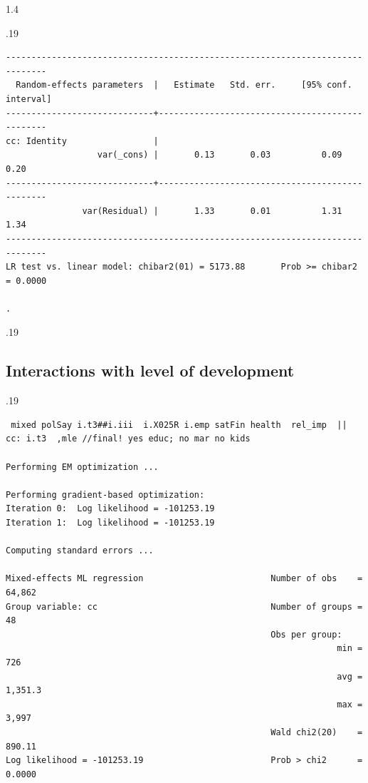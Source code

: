 \documentclass[10pt, letterpaper]{article}
\begin{document}
\begin{spacing}{1.4}
\begin{scriptsize}
\begin{spacing}{.19}
\begin{verbatim}
------------------------------------------------------------------------------
  Random-effects parameters  |   Estimate   Std. err.     [95% conf. interval]
-----------------------------+------------------------------------------------
cc: Identity                 |
                  var(_cons) |       0.13       0.03          0.09        0.20
-----------------------------+------------------------------------------------
               var(Residual) |       1.33       0.01          1.31        1.34
------------------------------------------------------------------------------
LR test vs. linear model: chibar2(01) = 5173.88       Prob >= chibar2 = 0.0000

. 
\end{verbatim}
\end{spacing}{.19}
\end{scriptsize}


\subsection{Interactions with level of development}

\begin{scriptsize}
\begin{spacing}{.19} 
\begin{verbatim}
 mixed polSay i.t3##i.iii  i.X025R i.emp satFin health  rel_imp  || cc: i.t3  ,mle //final! yes educ; no mar no kids

Performing EM optimization ...

Performing gradient-based optimization: 
Iteration 0:  Log likelihood = -101253.19  
Iteration 1:  Log likelihood = -101253.19  

Computing standard errors ...

Mixed-effects ML regression                         Number of obs    =  64,862
Group variable: cc                                  Number of groups =      48
                                                    Obs per group:
                                                                 min =     726
                                                                 avg = 1,351.3
                                                                 max =   3,997
                                                    Wald chi2(20)    =  890.11
Log likelihood = -101253.19                         Prob > chi2      =  0.0000


\end{verbatim}
\end{spacing}
\end{scriptsize}
\end{spacing}
\end{document}
